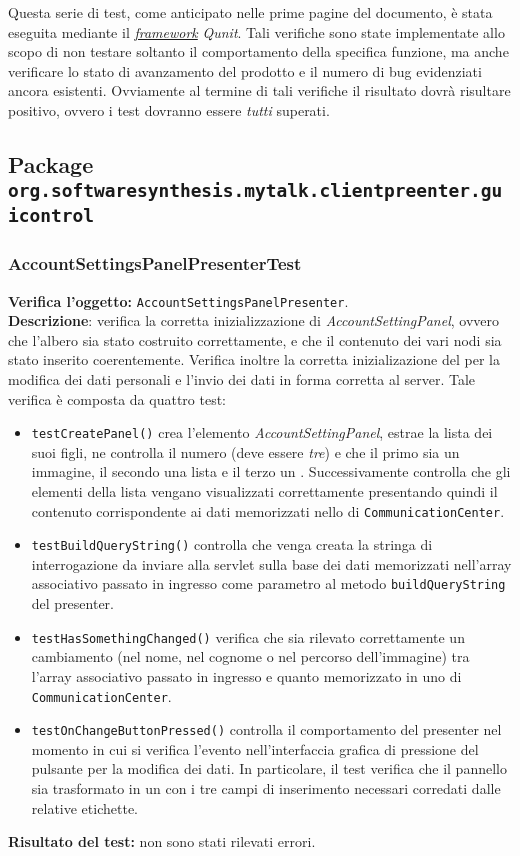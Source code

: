 Questa serie di test, come anticipato nelle prime pagine del documento, è stata eseguita mediante il \underline{\textit{framework}} \textit{Qunit}. Tali verifiche sono state implementate allo scopo di non testare soltanto il comportamento della specifica funzione, ma anche verificare lo stato di avanzamento del prodotto e il numero di bug evidenziati ancora esistenti.
Ovviamente al termine di tali verifiche il risultato dovrà risultare positivo, ovvero i test dovranno essere \textit{tutti} superati.

\subsection{Package \texttt{org.softwaresynthesis.mytalk.clientpreenter.guicontrol}}
\subsubsection{AccountSettingsPanelPresenterTest}
\textbf{Verifica l'oggetto:} \texttt{AccountSettingsPanelPresenter}.\\
\textbf{Descrizione}: verifica la corretta inizializzazione di \textit{AccountSettingPanel}, ovvero che l'albero sia stato costruito correttamente, e che il contenuto dei vari nodi sia stato inserito coerentemente. Verifica inoltre la corretta inizializazione del  per la modifica dei dati personali e l'invio dei dati in forma corretta al server.
Tale verifica è composta da quattro test:
\begin{itemize}
\item \texttt{testCreatePanel()} crea l'elemento \textit{AccountSettingPanel}, estrae la lista dei suoi figli, ne controlla il numero (deve essere \textit{tre}) e che il primo sia un immagine, il secondo una lista e il terzo un .
Successivamente controlla che gli elementi della lista vengano visualizzati correttamente presentando quindi il contenuto corrispondente ai dati memorizzati nello  di \texttt{CommunicationCenter}.
\item \texttt{testBuildQueryString()} controlla che venga creata la stringa di interrogazione da inviare alla servlet sulla base dei dati memorizzati nell'array associativo passato in ingresso come parametro al metodo \texttt{buildQueryString} del presenter.
\item \texttt{testHasSomethingChanged()} verifica che sia rilevato correttamente un cambiamento (nel nome, nel cognome o nel percorso dell'immagine) tra l'array associativo passato in ingresso e quanto memorizzato in uno  di \texttt{CommunicationCenter}.
\item \texttt{testOnChangeButtonPressed()} controlla il comportamento del presenter nel momento in cui si verifica l'evento nell'interfaccia grafica di pressione del pulsante per la modifica dei dati. In particolare, il test verifica che il pannello sia trasformato in un  con i tre campi di inserimento necessari corredati dalle relative etichette.
\end{itemize}
\textbf{Risultato del test:} non sono stati rilevati errori.

